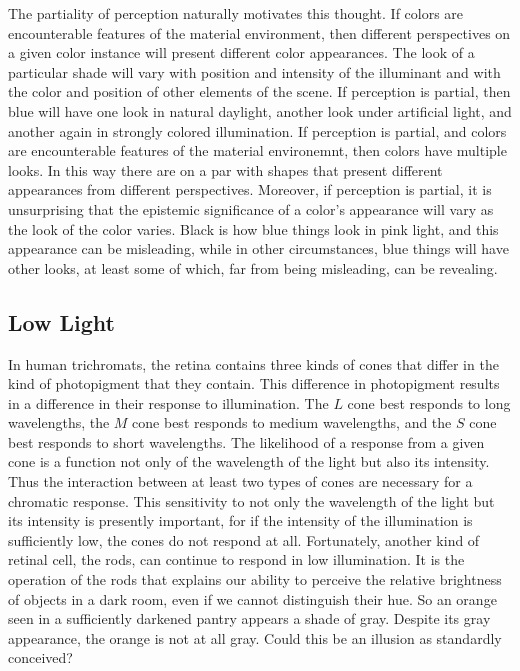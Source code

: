 \documentclass[12pt]{article}
\begin{document}
The partiality of perception naturally motivates this thought. If colors are encounterable features of the material environment, then different perspectives on a given color instance will present different color appearances. The look of a particular shade will vary with position and intensity of the illuminant and with the color and position of other elements of the scene. If perception is partial, then blue will have one look in natural daylight, another look under artificial light, and another again in strongly colored illumination. If perception is partial, and colors are encounterable features of the material environemnt, then colors have multiple looks. In this way there are on a par with shapes that present different appearances from different perspectives. Moreover, if perception is partial, it is unsurprising that the epistemic significance of a color's appearance will vary as the look of the color varies. Black is how blue things look in pink light, and this appearance can be misleading, while in other circumstances, blue things will have other looks, at least some of which, far from being misleading, can be revealing.


\subsection{Low Light}\label{sub:low_light} %

In human trichromats, the retina contains three kinds of cones that differ in the kind of photopigment that they contain. This difference in photopigment results in a difference in their response to illumination. The \( L \) cone best responds to long wavelengths, the \( M \) cone best responds to medium wavelengths, and the \( S \) cone best responds to short wavelengths. The likelihood of a response from a given cone is a function not only of the wavelength of the light but also its intensity. Thus the interaction between at least two types of cones are necessary for a chromatic response. This sensitivity to not only the wavelength of the light but its intensity is presently important, for if the intensity of the illumination is sufficiently low, the cones do not respond at all. Fortunately, another kind of retinal cell, the rods, can continue to respond in low illumination. It is the operation of the rods that explains our ability to perceive the relative brightness of objects in a dark room, even if we cannot distinguish their hue. So an orange seen in a sufficiently darkened pantry appears a shade of gray. Despite its gray appearance, the orange is not at all gray. Could this be an illusion as standardly conceived?
\end{document}
